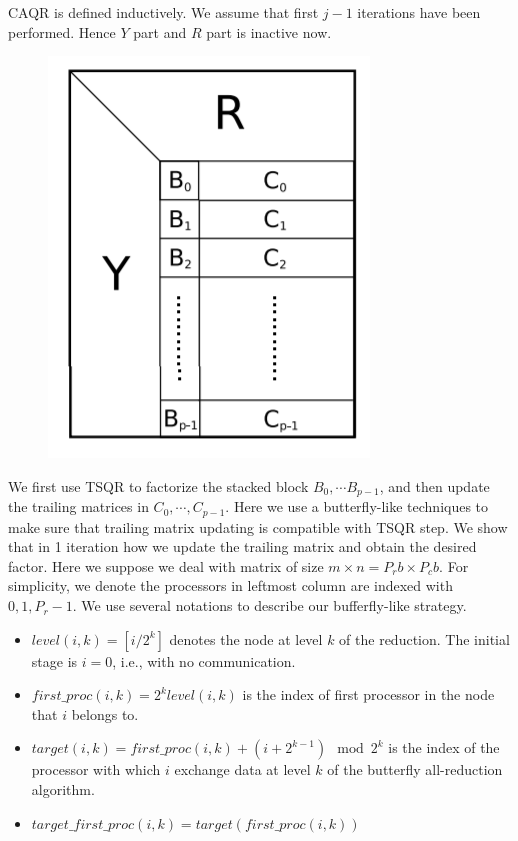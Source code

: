 \documentclass{article}
\begin{document}
CAQR is defined inductively. We assume that first $j-1$ iterations have been performed. Hence $Y$ part and $R$ part is inactive now. 
\begin{figure}[htbp]
	\centering 
	\includegraphics[scale=0.4]{CAQR.png}
\end{figure}
We first use TSQR to factorize the stacked block $B_0, \cdots B_{p-1}$, and then update the trailing matrices in $C_{0}, \cdots, C_{p-1}$. Here we use a butterfly-like techniques to make sure that trailing matrix updating is compatible with TSQR step. We show that in 1 iteration how we update the trailing matrix and obtain the desired factor. Here we suppose we deal with matrix of size $m\times n = P_rb \times P_cb$. For simplicity, we denote the processors in leftmost column are indexed with $0,1,P_r-1$. We use several notations to describe our bufferfly-like strategy.

\begin{itemize}
	\item $level(i,k) = [i/2^k]$ denotes the node at level $k$ of the reduction. The initial stage is $i=0$, i.e., with no communication.
	\item $first\_proc(i,k) = 2^klevel(i,k)$ is the index of first processor in the node that $i$ belongs to.
	\item $target(i,k) = first\_proc(i,k) + (i + 2^{k-1}) \mod 2^k$ is the index of the processor with which $i$ exchange data at level $k$ of the butterfly all-reduction algorithm.
	\item $target\_first\_proc(i,k) = target(first\_proc(i,k))$
\end{itemize}
\end{document}
